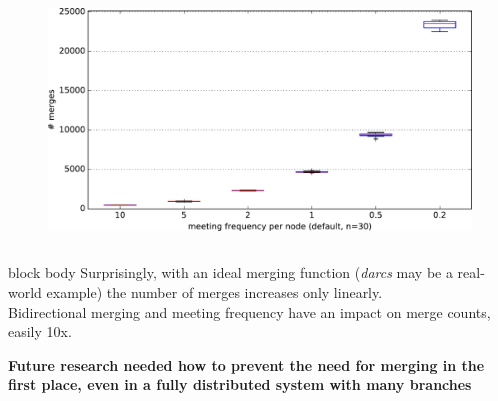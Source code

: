 \documentclass[final,hyperref={pdfpagelabels=false}]{beamer}
\begin{document}
\begin{frame}
\begin{columns}
\begin{column}{.9\textwidth}
\begin{columns}
\begin{column}{.3\textwidth}
\begin{figure}
      \includegraphics[width=\linewidth]{fig/dumb_meeting_frequency_n=30.pdf}
    \end{figure}
  \end{column}

  \end{columns}

  \vspace{10mm}
  \begin{center}
  
  \end{center}


  \vspace{1mm}
  \begin{beamercolorbox}[leftskip=0.5em,rightskip=0.5em,colsep*=.75ex,sep=0.5ex,vmode]{block body}%
  \vspace{0.2em}
  Surprisingly, with an ideal merging function (\textit{darcs} may be a real-world example) the number of merges increases only linearly. \\
  Bidirectional merging and meeting frequency have an impact on merge counts, easily 10x. \\
  \vspace{0.2em}
  \end{beamercolorbox}

  \vspace{1.5cm}
  \begin{center}
  \textbf{Future research needed how to prevent the need for merging in the first place, even in a fully distributed system with many branches}
  \end{center}

\end{column}
\end{columns}
\end{frame}
\end{document}
